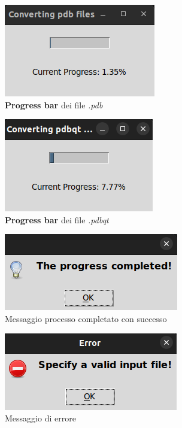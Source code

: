 \begin{figure}[H]
    \centering
    \includegraphics{immagini/pdbProgressBar.png}
    \caption{\textbf{Progress bar} dei file \textit{.pdb}}
    \label{fig:pdb progress bar}
\end{figure}

\begin{figure}[H]
    \centering
    \includegraphics{immagini/pdbqtProgressBar.png}
    \caption{\textbf{Progress bar} dei file \textit{.pdbqt}}
    \label{fig:pdbqt progress bar}
\end{figure}

\begin{figure}[H]
    \centering
    \includegraphics{immagini/progressCompleted.png}
    \caption{Messaggio processo completato con successo}
    \label{fig:progress completed}
\end{figure}

\begin{figure}[H]
    \centering
    \includegraphics{immagini/invalidInput.png}
    \caption{Messaggio di errore}
    \label{fig:Invalid input}
\end{figure}



